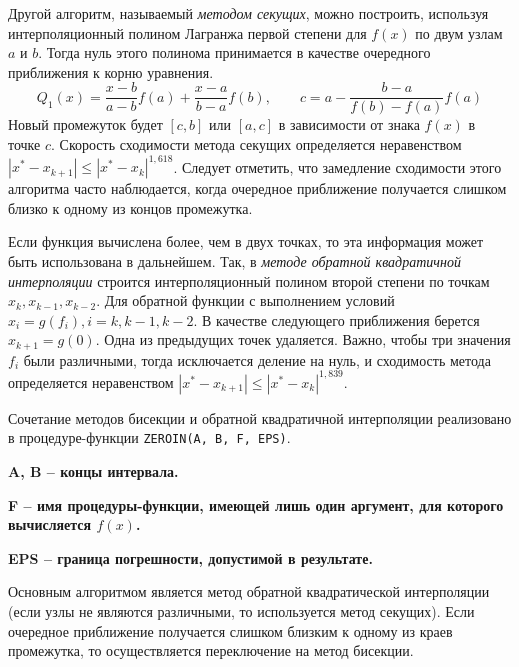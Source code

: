 Другой алгоритм, называемый \emph{методом секущих}, можно построить, используя интерполяционный полином Лагранжа первой
степени для $f(x)$ по двум узлам $a$ и $b$. Тогда нуль этого полинома принимается в качестве очередного приближения к
корню уравнения.
\begin{equation*}
    Q_1(x) = \frac{x - b}{a - b}f(a) + \frac{x - a}{b - a}f(b), \qquad c = a - \frac{b - a}{f(b) - f(a)}f(a)
\end{equation*}
Новый промежуток будет $[c, b]$ или $[a, c]$ в зависимости от знака $f(x)$ в точке $c$. Скорость сходимости метода
секущих определяется неравенством $\displaystyle \left| x^* - x_{k+1} \right| \leq \left| x^* - x_k \right|^{1,618}$.
Следует отметить, что замедление сходимости этого алгоритма часто наблюдается, когда очередное приближение получается
слишком близко к одному из концов промежутка.

Если функция вычислена более, чем в двух точках, то эта информация может быть использована в дальнейшем. Так, в
\emph{методе обратной квадратичной интерполяции} строится интерполяционный полином второй степени по точкам
$x_k, x_{k-1}, x_{k-2}$. Для обратной функции с выполнением условий $\displaystyle x_i = g(f_i), i = k, k-1, k-2$.
В качестве следующего приближения берется $\displaystyle x_{k+1} = g(0)$. Одна из предыдущих точек удаляется. Важно,
чтобы три значения $f_i$ были различными, тогда исключается деление на нуль, и сходимость метода определяется
неравенством $\displaystyle \left| x^* - x_{k+1} \right| \leq \left| x^* - x_k \right|^{1,839}$.
\vspace{10pt}

Сочетание методов бисекции и обратной квадратичной интерполяции реализовано в процедуре-функции
\verb|ZEROIN(A, B, F, EPS)|.

\bf{A}, \bf{B} -- концы интервала.

\bf{F} -- имя процедуры-функции, имеющей лишь один аргумент, для которого вычисляется $f(x)$.

\bf{EPS} -- граница погрешности, допустимой в результате.
\vspace{10pt}

Основным алгоритмом является метод обратной квадратической интерполяции (если узлы не являются различными, то
используется метод секущих). Если очередное приближение получается слишком близким к одному из краев промежутка, то
осуществляется переключение на метод бисекции.
